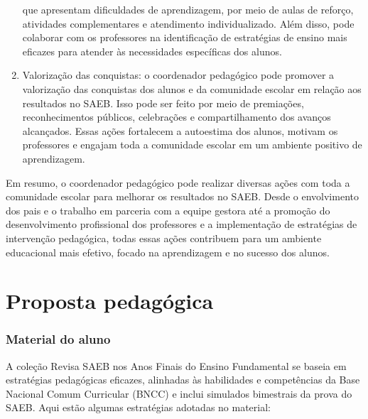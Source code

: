 \begin{enumerate}
  que apresentam dificuldades de aprendizagem, por meio de aulas de
  reforço, atividades complementares e atendimento individualizado. Além
  disso, pode colaborar com os professores na identificação de
  estratégias de ensino mais eficazes para atender às necessidades
  específicas dos alunos.
\item
  Valorização das conquistas: o coordenador pedagógico pode promover a
  valorização das conquistas dos alunos e da comunidade escolar em
  relação aos resultados no SAEB. Isso pode ser feito por meio de
  premiações, reconhecimentos públicos, celebrações e compartilhamento
  dos avanços alcançados. Essas ações fortalecem a autoestima dos
  alunos, motivam os professores e engajam toda a comunidade escolar em
  um ambiente positivo de aprendizagem.
\end{enumerate}

Em resumo, o coordenador pedagógico pode realizar diversas ações com
toda a comunidade escolar para melhorar os resultados no SAEB. Desde o
envolvimento dos pais e o trabalho em parceria com a equipe gestora até
a promoção do desenvolvimento profissional dos professores e a
implementação de estratégias de intervenção pedagógica, todas essas
ações contribuem para um ambiente educacional mais efetivo, focado na
aprendizagem e no sucesso dos alunos.

\section{Proposta pedagógica}

\subsubsection{Material do aluno}\label{material-do-aluno}

A coleção Revisa SAEB nos Anos Finais do Ensino Fundamental se baseia
em estratégias pedagógicas eficazes, alinhadas às habilidades e
competências da Base Nacional Comum Curricular (BNCC) e inclui simulados
bimestrais da prova do SAEB. Aqui estão algumas estratégias adotadas no
material:

